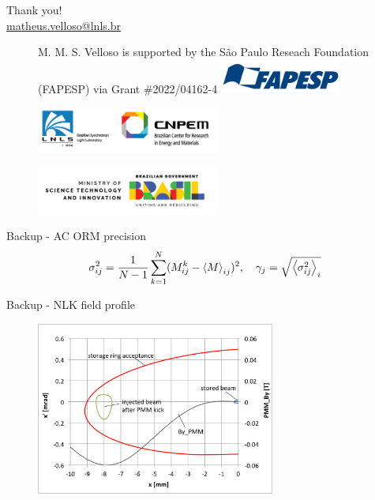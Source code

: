 \documentclass[aspectratio=169]{beamer}
\begin{document}
\begin{frame}
    Thank you!\\
    \vfill
    \url{matheus.velloso@lnls.br}\\
    \vfill
    \begin{figure}
        \centering
        \scriptsize
        M. M. S. Velloso is supported by the São Paulo Reseach Foundation (FAPESP) via Grant \#2022/04162-4
        \includegraphics[width=4cm]{fapesp.png}
    \end{figure}
    \begin{minipage}{0.49\textwidth}
        \begin{figure}
            \includegraphics[width=6cm]{cnpem_lnls.png}
        \end{figure}
    \end{minipage}
    \begin{minipage}{0.49\textwidth}
        \begin{figure}
            \includegraphics[width=6cm]{mcti.png}
        \end{figure}
    \end{minipage}
    \vfill
\end{frame}
\begin{frame}[noframenumbering]{Backup - AC ORM precision}
    \begin{equation*}
        \sigma_{ij}^2 = \frac{1}{N-1}\sum_{k=1}^{N}(M_{ij}^k - \ev{M}_{ij})^2, \quad 
        \gamma_j = \sqrt{\ev{\sigma_{ij}^2}_i}
    \end{equation*}
\end{frame}
\begin{frame}[noframenumbering]{Backup - NLK field profile}
    \begin{figure}
        \centering
        \includegraphics[width=0.7\textwidth]{nlk_phase_space.png}
    \end{figure}
\end{frame}
\end{document}
